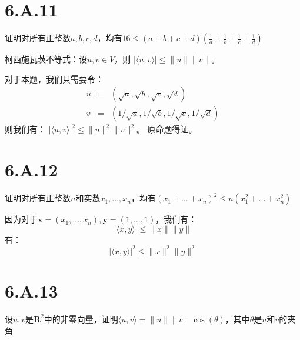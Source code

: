 \documentclass[10pt,a4paper,UTF8]{article}
\begin{document}
\section{6.A.11}
\label{sec:org1c016d2}


\begin{tikzproblem}
证明对所有正整数\(a,b,c,d\)，均有\(16 \leq (a+b+c+d)(\tfrac{1}{a} + \tfrac{1}{b} + \tfrac{1}{c} + \tfrac{1}{d})\)
\end{tikzproblem}

\begin{tikzanswer}
柯西施瓦茨不等式：设\(u,v\in V\)，则 \(| \langle u,v \rangle  | \leq \| u \| \| v \|\)。

对于本题，我们只需要令：
\begin{eqnarray}
\label{eq:14}
u&=& (\sqrt{a},\sqrt{b},\sqrt{c},\sqrt{d}) \\
v&=& (1/\sqrt{a},1/\sqrt{b},1/\sqrt{c},1/\sqrt{d})
\end{eqnarray}
则我们有：
\(| \langle u,v \rangle  |^{2} \leq \| u \|^{2} \| v \|^{2}\)。
原命题得证。
\end{tikzanswer}
\section{6.A.12}
\label{sec:orga9c4d74}


\begin{tikzproblem}
证明对所有正整数\(n\)和实数\(x_{1},\ldots ,x_{n}\)，均有\((x_{1} + \ldots + x_{n})^{2} \leq n (x_{1}^{2} + \ldots + x_{n}^{2})\)
\end{tikzproblem}

\begin{tikzanswer}[柯西施瓦茨定理]
因为对于\(\mathbf{x} = (x_{1},\ldots ,x_{n}), \mathbf{y} = (1,\ldots ,1)\)，我们有：
\begin{equation}
\label{eq:15}
| \langle x,y \rangle  | \leq \| x \| \| y \|
\end{equation}
有：
\begin{equation}
\label{eq:16}
| \langle x,y \rangle  |^2 \leq \| x \|^2 \| y \|^2
\end{equation}
\end{tikzanswer}
\section{6.A.13}
\label{sec:orge33f92a}


\begin{tikzproblem}
设\(u,v\)是\(\mathbf{R}^{2}\)中的非零向量，证明\(\langle u,v \rangle  = \| u \| \| v \|\cos(\theta)\)，其中\(\theta\)是\(u\)和\(v\)的夹角
\end{tikzproblem}
\end{document}
